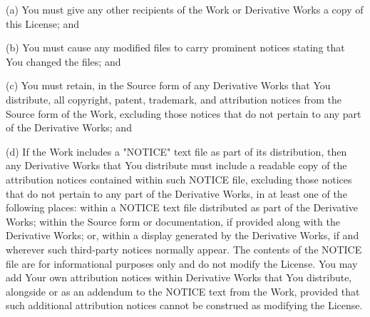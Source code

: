 \begin{DoxyEnumerate}
(a) You must give any other recipients of the Work or Derivative Works a copy of this License; and

(b) You must cause any modified files to carry prominent notices stating that You changed the files; and

(c) You must retain, in the Source form of any Derivative Works that You distribute, all copyright, patent, trademark, and attribution notices from the Source form of the Work, excluding those notices that do not pertain to any part of the Derivative Works; and

(d) If the Work includes a "{}\+NOTICE"{} text file as part of its distribution, then any Derivative Works that You distribute must include a readable copy of the attribution notices contained within such NOTICE file, excluding those notices that do not pertain to any part of the Derivative Works, in at least one of the following places\+: within a NOTICE text file distributed as part of the Derivative Works; within the Source form or documentation, if provided along with the Derivative Works; or, within a display generated by the Derivative Works, if and wherever such third-\/party notices normally appear. The contents of the NOTICE file are for informational purposes only and do not modify the License. You may add Your own attribution notices within Derivative Works that You distribute, alongside or as an addendum to the NOTICE text from the Work, provided that such additional attribution notices cannot be construed as modifying the License.


\end{DoxyEnumerate}
